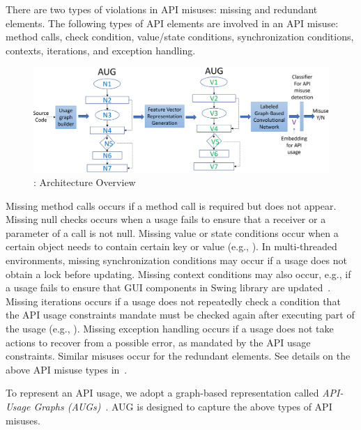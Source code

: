 \begin{Definition}
There are two types of violations in API misuses: missing and
redundant elements. The following types of API elements are
involved in an API misuse: method calls,  check condition,
value/state conditions, synchronization conditions, contexts,
iterations, and exception handling.
\end{Definition}

\begin{figure}[t]
\begin{center}
\includegraphics[width=5.4in]{overview.png}
\vspace{-5pt}
\caption{{\tool}: Architecture Overview}
\label{fig:overview}
\end{center}
\end{figure}

Missing method calls occurs if a method call is required but does not
appear. Missing null checks occurs when a usage fails to ensure that a
receiver or a parameter of a call is not null. Missing value or state
conditions occur when a certain object needs to contain certain key or
value (e.g., ). In multi-threaded environments, missing
synchronization conditions may occur if a usage does not obtain a lock
before updating. Missing context conditions may also occur, e.g., if a
usage fails to ensure that GUI components in Swing library are
updated~\cite{msr19}. Missing iterations occurs if a usage does not
repeatedly check a condition that the API usage constraints mandate
must be checked again after executing part of the usage (e.g.,
). Missing exception handling occurs if a usage does not
take actions to recover from a possible error, as mandated by the API
usage constraints. Similar misuses occur for the redundant
elements. See details on the above API misuse types in~\cite{msr19}.

To represent an API usage, we adopt a graph-based representation
called {\em API-Usage Graphs (AUGs)}~\cite{msr19}. AUG is designed
to capture the above types of API misuses.

